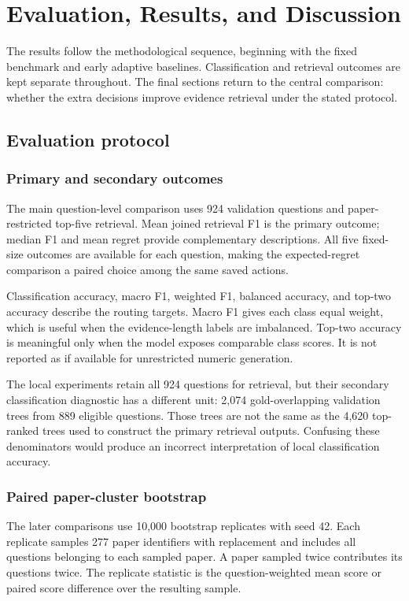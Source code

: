 \chapter{Evaluation, Results, and Discussion}
\label{ch:results}

The results follow the methodological sequence, beginning with the
fixed benchmark and early adaptive baselines. Classification and
retrieval outcomes are kept separate throughout. The final sections
return to the central comparison: whether the extra decisions improve
evidence retrieval under the stated protocol.

\section{Evaluation protocol}
\subsection{Primary and secondary outcomes}
The main question-level comparison uses 924 validation questions and
paper-restricted top-five retrieval. Mean joined retrieval F1 is the
primary outcome; median F1 and mean regret provide complementary
descriptions. All five fixed-size outcomes are available for each
question, making the expected-regret comparison a paired choice among
the same saved actions.

Classification accuracy, macro F1, weighted F1, balanced accuracy,
and top-two accuracy describe the routing targets. Macro F1 gives
each class equal weight, which is useful when the evidence-length
labels are imbalanced. Top-two accuracy is meaningful only when the
model exposes comparable class scores. It is not reported as if
available for unrestricted numeric generation.

The local experiments retain all 924 questions for retrieval, but
their secondary classification diagnostic has a different unit:
2,074 gold-overlapping validation trees from 889 eligible questions.
Those trees are not the same as the 4,620 top-ranked trees used to
construct the primary retrieval outputs. Confusing these denominators
would produce an incorrect interpretation of local classification
accuracy.

\subsection{Paired paper-cluster bootstrap}
The later comparisons use 10,000 bootstrap replicates with seed 42.
Each replicate samples 277 paper identifiers with replacement and
includes all questions belonging to each sampled paper. A paper
sampled twice contributes its questions twice. The replicate statistic
is the question-weighted mean score or paired score difference over
the resulting sample.

